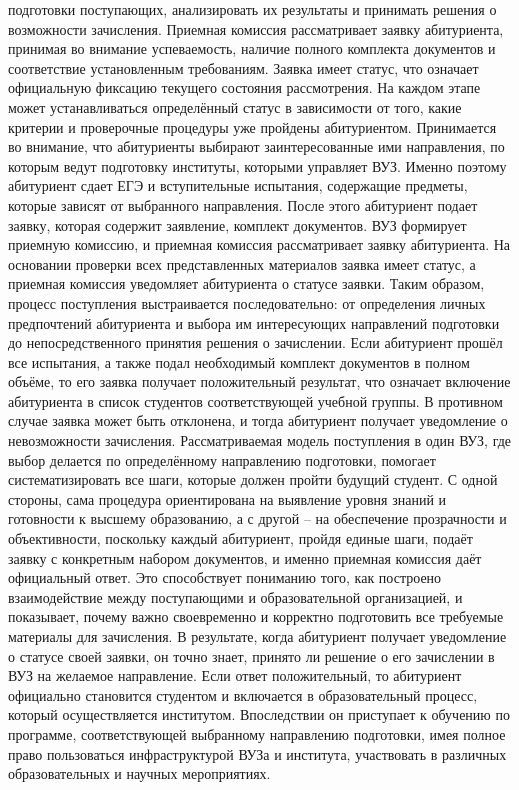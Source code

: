\documentclass[areasetadvanced]{scrartcl}
\begin{document}
подготовки поступающих, анализировать их результаты и принимать решения о
возможности зачисления. Приемная комиссия рассматривает заявку абитуриента, принимая
во внимание успеваемость, наличие полного комплекта документов и соответствие
установленным требованиям.
Заявка имеет статус, что означает официальную фиксацию текущего состояния
рассмотрения. На каждом этапе может устанавливаться определённый статус в зависимости
от того, какие критерии и проверочные процедуры уже пройдены абитуриентом.
Принимается во внимание, что абитуриенты выбирают заинтересованные ими направления,
по которым ведут подготовку институты, которыми управляет ВУЗ. Именно поэтому
абитуриент сдает ЕГЭ и вступительные испытания, содержащие предметы, которые зависят
от выбранного направления. После этого абитуриент подает заявку, которая содержит
заявление, комплект документов. ВУЗ формирует приемную комиссию, и приемная
комиссия рассматривает заявку абитуриента. На основании проверки всех представленных
материалов заявка имеет статус, а приемная комиссия уведомляет абитуриента о статусе
заявки. Таким образом, процесс поступления выстраивается последовательно: от
определения личных предпочтений абитуриента и выбора им интересующих направлений
подготовки до непосредственного принятия решения о зачислении. Если абитуриент прошёл
все испытания, а также подал необходимый комплект документов в полном объёме, то его
заявка получает положительный результат, что означает включение абитуриента в список
студентов соответствующей учебной группы. В противном случае заявка может быть
отклонена, и тогда абитуриент получает уведомление о невозможности зачисления.
Рассматриваемая модель поступления в один ВУЗ, где выбор делается по определённому
направлению подготовки, помогает систематизировать все шаги, которые должен пройти
будущий студент. С одной стороны, сама процедура ориентирована на выявление уровня
знаний и готовности к высшему образованию, а с другой – на обеспечение прозрачности и
объективности, поскольку каждый абитуриент, пройдя единые шаги, подаёт заявку с
конкретным набором документов, и именно приемная комиссия даёт официальный ответ.
Это способствует пониманию того, как построено взаимодействие между поступающими и
образовательной организацией, и показывает, почему важно своевременно и корректно
подготовить все требуемые материалы для зачисления.
В результате, когда абитуриент получает уведомление о статусе своей заявки, он точно
знает, принято ли решение о его зачислении в ВУЗ на желаемое направление. Если ответ
положительный, то абитуриент официально становится студентом и включается в
образовательный процесс, который осуществляется институтом. Впоследствии он
приступает к обучению по программе, соответствующей выбранному направлению
подготовки, имея полное право пользоваться инфраструктурой ВУЗа и института,
участвовать в различных образовательных и научных мероприятиях.
\newpage
\end{document}
